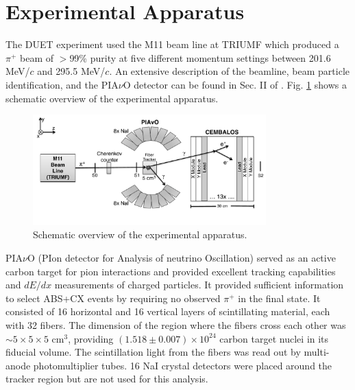 \section{Experimental Apparatus}\label{sec:experiment}
The DUET experiment used the M11 beam line at TRIUMF which produced a $\pi^{+}$ beam of $>$99\% purity at five different momentum settings between 201.6 MeV/$c$ and 295.5 MeV/$c$. An extensive description of the beamline, beam particle identification, and the PIA$\nu$O detector can be found in Sec. II of \cite{duet}. Fig.  \ref{fig:config} shows a schematic overview of the experimental apparatus.

\begin{figure}[ht]
\includegraphics[width=90mm]{figures/duet_schematic_forpaper_v2.pdf}
\caption{Schematic overview of the experimental apparatus.}
\label{fig:config}
\end{figure}


PIA$\nu$O (PIon detector for Analysis of neutrino Oscillation) served as an active carbon target for pion interactions and  provided excellent tracking capabilities and $dE/dx$ measurements of charged particles. It provided sufficient information to select ABS+CX events by requiring no observed $\pi^{+}$ in the final state. It consisted of 16 horizontal and 16 vertical layers of scintillating material, each with 32 fibers. The dimension of the region where the fibers cross each other was $\sim5\times5\times5$ cm$^3$, providing $(1.518\pm0.007)\times10^{24}$ carbon target nuclei in its fiducial volume. The scintillation light from the fibers was read out by multi-anode photomultiplier tubes. 16 NaI crystal detectors were placed around the tracker region but are not used for this analysis.

